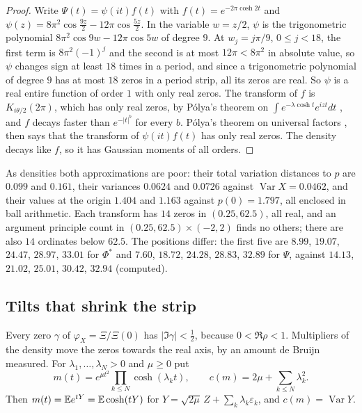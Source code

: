\begin{proof}
Write $\Psi(t)=\psi(it)f(t)$ with $f(t)=e^{-2\pi\cosh2t}$ and $\psi(z)=8\pi^2\cos\frac{9z}2-12\pi\cos\frac{5z}2$. In the variable $w=z/2$, $\psi$ is the trigonometric polynomial $8\pi^2\cos9w-12\pi\cos5w$ of degree $9$. At $w_j=j\pi/9$, $0\le j<18$, the first term is $8\pi^2(-1)^j$ and the second is at most $12\pi<8\pi^2$ in absolute value, so $\psi$ changes sign at least $18$ times in a period, and since a trigonometric polynomial of degree $9$ has at most $18$ zeros in a period strip, all its zeros are real. So $\psi$ is a real entire function of order $1$ with only real zeros. The transform of $f$ is $K_{i\theta/2}(2\pi)$, which has only real zeros, by P\'olya's theorem on $\int e^{-\lambda\cosh t}e^{izt}dt$ \cite[(1.2)]{deBruijn}, and $f$ decays faster than $e^{-|t|^b}$ for every $b$. P\'olya's theorem on universal factors \cite[p.~197]{deBruijn}, \cite[Proposition~1]{Cardon2005} then says that the transform of $\psi(it)f(t)$ has only real zeros. The density decays like $f$, so it has Gaussian moments of all orders.
\end{proof}

As densities both approximations are poor: their total variation distances to $p$ are $0.099$ and $0.161$, their variances $0.0624$ and $0.0726$ against $\operatorname{Var}X=0.0462$, and their values at the origin $1.404$ and $1.163$ against $p(0)=1.797$, all enclosed in ball arithmetic. Each transform has $14$ zeros in $(0.25,62.5)$, all real, and an argument principle count in $(0.25,62.5)\times(-2,2)$ finds no others; there are also $14$ ordinates below $62.5$. The positions differ: the first five are $8.99$, $19.07$, $24.47$, $28.97$, $33.01$ for $\Phi^*$ and $7.60$, $18.72$, $24.28$, $28.83$, $32.89$ for $\Psi$, against $14.13$, $21.02$, $25.01$, $30.42$, $32.94$ (computed).

\subsection{Tilts that shrink the strip}\label{fm:sec:tilts}

Every zero $\gamma$ of $\varphi_X=\Xi/\Xi(0)$ has $|\Im\gamma|<\frac12$, because $0<\Re\rho<1$. Multipliers of the density move the zeros towards the real axis, by an amount de Bruijn measured. For $\lambda_1,\dots,\lambda_N>0$ and $\mu\ge0$ put
\[
m(t)=e^{\mu t^2}\prod_{k\le N}\cosh(\lambda_kt),\qquad c(m)=2\mu+\sum_{k\le N}\lambda_k^2 .
\]
Then $m(t)=\mathbb{E} e^{tY}=\mathbb{E}\cosh(tY)$ for $Y=\sqrt{2\mu}\,Z+\sum_k\lambda_k\varepsilon_k$, and $c(m)=\operatorname{Var}Y$.

